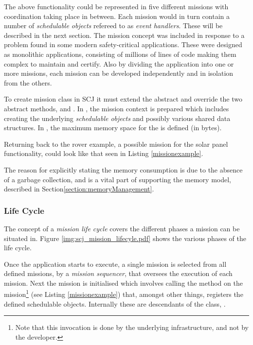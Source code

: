 The above functionality could be represented in five different missions with coordination taking place in between. Each mission would in turn contain a number of \textit{schedulable objects} refereed to as \textit{event handlers}. These will be described in the next section. The mission concept was included in response to a problem found in some modern safety-critical applications. These were designed as monolithic applications, consisting of millions of lines of code making them complex to maintain and certify. Also by dividing the application into one or more missions, each mission can be developed independently and in isolation from the others.  

To create mission class in SCJ it must extend the abstract  and override the two abstract methods,  and . In , the mission context is prepared which includes creating the underlying \textit{schedulable objects} and possibly various shared data structures. In , the maximum memory space for the  is defined (in bytes).

Returning back to the rover example, a possible mission for the solar panel functionality, could look like that seen in Listing \ref{missionexample}.



The reason for explicitly stating the memory consumption is due to the absence of a garbage collection, and is a vital part of supporting the memory model, described in Section\ref{section:memoryManagement}.

\subsubsection{Life Cycle}
\label{subsec:lifecycle}
The concept of a \textit{mission life cycle} covers the different phases a mission can be situated in. Figure \ref{img:scj_mission_lifecyle.pdf} shows the various phases of the life cycle.


Once the application starts to execute, a single mission is selected from all defined missions, by a \textit{mission sequencer}, that oversees the execution of each mission. Next the mission is initialised which involves calling the  method on the mission\footnote{Note that this invocation is done by the underlying infrastructure, and not by the developer.} (see Listing \ref{missionexample}) that, amongst other things, registers the defined schedulable objects. Internally these are descendants of the class, . 

